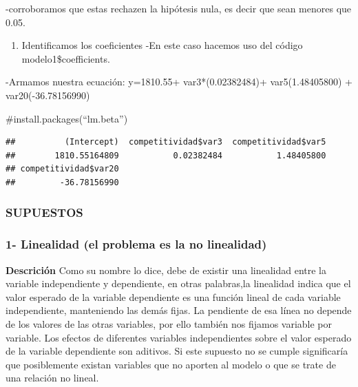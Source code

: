\documentclass[
]{article}
\newenvironment{Shaded}{\begin{snugshade}}{\end{snugshade}}
\newcommand{\FunctionTok}[1]{\textcolor[rgb]{0.00,0.00,0.00}{#1}}
\newcommand{\NormalTok}[1]{#1}
\newcommand{\SpecialCharTok}[1]{\textcolor[rgb]{0.00,0.00,0.00}{#1}}
\providecommand{\tightlist}{%
  \setlength{\itemsep}{0pt}\setlength{\parskip}{0pt}}
\begin{document}
-corroboramos que estas rechazen la hipótesis nula, es decir que sean
menores que 0.05.

\begin{enumerate}
\def\labelenumi{\arabic{enumi}.}
\setcounter{enumi}{3}
\tightlist
\item
  Identificamos los coeficientes -En este caso hacemos uso del código
  modelo1\$coefficients.
\end{enumerate}

-Armamos nuestra ecuación: y=1810.55+ var3*(0.02382484)+
var5(1.48405800) + var20(-36.78156990)

\#install.packages(``lm.beta'')

\begin{Shaded}
\end{Shaded}

\begin{verbatim}
##          (Intercept)  competitividad$var3  competitividad$var5 
##        1810.55164809           0.02382484           1.48405800 
## competitividad$var20 
##         -36.78156990
\end{verbatim}

\hypertarget{supuestos}{%
\subsubsection{SUPUESTOS}\label{supuestos}}

\hypertarget{linealidad-el-problema-es-la-no-linealidad}{%
\subsubsection{1- Linealidad (el problema es la no
linealidad)}\label{linealidad-el-problema-es-la-no-linealidad}}

\textbf{Descrición} Como su nombre lo dice, debe de existir una
linealidad entre la variable independiente y dependiente, en otras
palabras,la linealidad indica que el valor esperado de la variable
dependiente es una función lineal de cada variable independiente,
manteniendo las demás fijas. La pendiente de esa línea no depende de los
valores de las otras variables, por ello también nos fijamos variable
por variable. Los efectos de diferentes variables independientes sobre
el valor esperado de la variable dependiente son aditivos. Si este
supuesto no se cumple significaría que posiblemente existan variables
que no aporten al modelo o que se trate de una relación no lineal.
\end{document}
